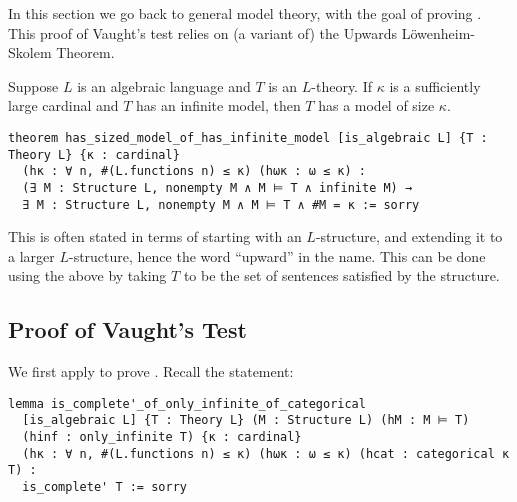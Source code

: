 In this section we go back to general model theory,
with the goal of proving .
This proof of Vaught's test relies on (a variant of) the
Upwards L\"{o}wenheim-Skolem Theorem.

\begin{prop}
  Suppose $L$ is an algebraic language and $T$ is an $L$-theory.
  If $\kappa$ is a sufficiently large cardinal and $T$ has an infinite model,
  then $T$ has a model of size $\kappa$.

  \begin{lstlisting}
theorem has_sized_model_of_has_infinite_model [is_algebraic L] {T : Theory L} {κ : cardinal}
  (hκ : ∀ n, #(L.functions n) ≤ κ) (hωκ : ω ≤ κ) :
  (∃ M : Structure L, nonempty M ∧ M ⊨ T ∧ infinite M) →
  ∃ M : Structure L, nonempty M ∧ M ⊨ T ∧ #M = κ := sorry \end{lstlisting}
\end{prop}

This is often stated in terms of starting with an $L$-structure,
and extending it to a larger $L$-structure,
hence the word ``upward'' in the name.
This can be done using the above by taking $T$ to be the set of
sentences satisfied by the structure.

\subsection{Proof of Vaught's Test}

We first apply  to prove .
Recall the statement:

\begin{lstlisting}
lemma is_complete'_of_only_infinite_of_categorical
  [is_algebraic L] {T : Theory L} (M : Structure L) (hM : M ⊨ T)
  (hinf : only_infinite T) {κ : cardinal}
  (hκ : ∀ n, #(L.functions n) ≤ κ) (hωκ : ω ≤ κ) (hcat : categorical κ T) :
  is_complete' T := sorry \end{lstlisting}

